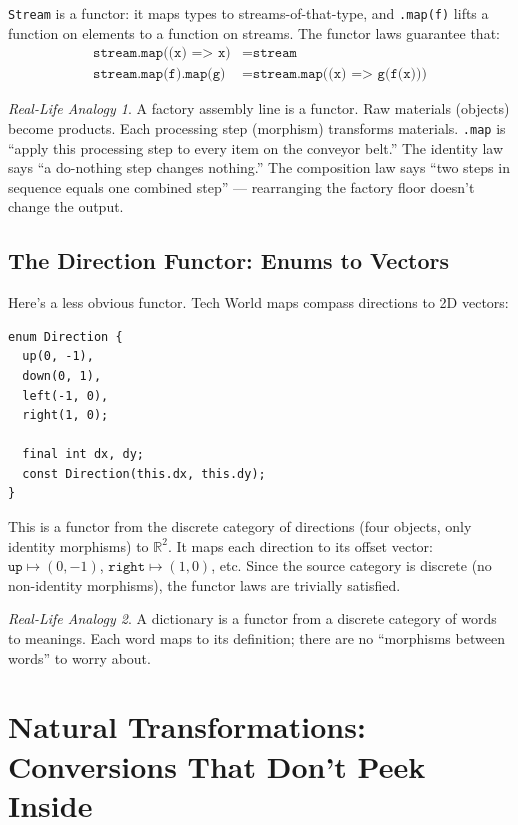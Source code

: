 \documentclass[12pt,a4paper]{article}
\theoremstyle{definition}
\theoremstyle{plain}
\theoremstyle{remark}
\newtheorem*{reallife}{Real-Life Analogy}
\begin{document}
\texttt{Stream} is a functor: it maps types to streams-of-that-type, and
\texttt{.map(f)} lifts a function on elements to a function on streams.
The functor laws guarantee that:
\begin{align}
\texttt{stream.map((x) => x)} &= \texttt{stream} \tag{Identity} \\
\texttt{stream.map(f).map(g)} &= \texttt{stream.map((x) => g(f(x)))} \tag{Composition}
\end{align}

\begin{reallife}
A factory assembly line is a functor.
Raw materials (objects) become products.
Each processing step (morphism) transforms materials.
\texttt{.map} is ``apply this processing step to every item on the conveyor belt.''
The identity law says ``a do-nothing step changes nothing.''
The composition law says ``two steps in sequence equals one combined step''
--- rearranging the factory floor doesn't change the output.
\end{reallife}

\subsection{The Direction Functor: Enums to Vectors}

Here's a less obvious functor. Tech World maps compass directions to 2D vectors:

\begin{lstlisting}
enum Direction {
  up(0, -1),
  down(0, 1),
  left(-1, 0),
  right(1, 0);

  final int dx, dy;
  const Direction(this.dx, this.dy);
}
\end{lstlisting}

This is a functor from the discrete category of directions (four objects,
only identity morphisms) to $\mathbb{R}^2$.
It maps each direction to its offset vector: $\texttt{up} \mapsto (0, -1)$,
$\texttt{right} \mapsto (1, 0)$, etc.
Since the source category is discrete (no non-identity morphisms),
the functor laws are trivially satisfied.

\begin{reallife}
A dictionary is a functor from a discrete category of words to meanings.
Each word maps to its definition; there are no ``morphisms between words''
to worry about.
\end{reallife}


\section{Natural Transformations: Conversions That Don't Peek Inside}
\label{sec:natural-transformations}
\end{document}
